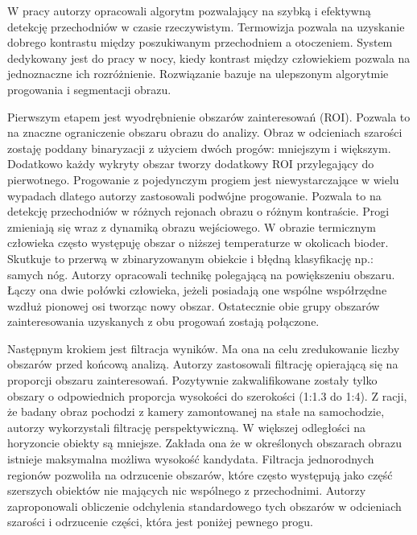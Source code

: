 W pracy \cite{kolzpoz} autorzy opracowali algorytm pozwalający na szybką i efektywną detekcję przechodniów w czasie rzeczywistym. 
Termowizja pozwala na uzyskanie dobrego kontrastu między poszukiwanym przechodniem a otoczeniem. 
System dedykowany jest do pracy w nocy, kiedy kontrast między człowiekiem pozwala na jednoznaczne ich rozróżnienie.  %
Rozwiązanie bazuje na ulepszonym algorytmie progowania i segmentacji obrazu. 

Pierwszym etapem jest wyodrębnienie obszarów zainteresowań (ROI). 
Pozwala to na znaczne ograniczenie obszaru obrazu do analizy. %
Obraz w odcieniach szarości zostaję poddany binaryzacji z użyciem dwóch progów: mniejszym i większym. 
Dodatkowo każdy wykryty obszar tworzy dodatkowy ROI przylegający do pierwotnego. %
Progowanie z pojedynczym progiem jest niewystarczające w wielu wypadach dlatego autorzy zastosowali podwójne progowanie. %
Pozwala to na detekcję przechodniów w różnych rejonach obrazu o różnym kontraście. 
Progi zmieniają się wraz z dynamiką obrazu wejściowego. 
W obrazie termicznym człowieka często występuję obszar o niższej temperaturze w okolicach bioder. 
Skutkuje to przerwą w zbinaryzowanym obiekcie i błędną klasyfikację np.: samych nóg. 
Autorzy opracowali technikę polegającą na powiększeniu obszaru. 
Łączy ona dwie połówki człowieka, jeżeli posiadają one wspólne współrzędne wzdłuż pionowej osi tworząc nowy obszar. %
Ostatecznie obie grupy obszarów zainteresowania uzyskanych z obu progowań zostają połączone. %

Następnym krokiem jest filtracja wyników. 
Ma ona na celu zredukowanie liczby obszarów przed końcową analizą. 
Autorzy zastosowali filtrację opierającą się na proporcji obszaru zainteresowań. 
Pozytywnie zakwalifikowane zostały tylko obszary o odpowiednich proporcja wysokości do szerokości (1:1.3 do 1:4). 
Z racji, że badany obraz pochodzi z kamery zamontowanej na stałe na samochodzie, autorzy wykorzystali filtrację perspektywiczną. 
W większej odległości na horyzoncie obiekty są mniejsze. %
Zakłada ona że w określonych obszarach obrazu istnieje maksymalna możliwa wysokość kandydata. 
Filtracja jednorodnych regionów pozwoliła na odrzucenie obszarów, które często występują jako część szerszych obiektów nie mających nic wspólnego z przechodnimi. %
Autorzy zaproponowali obliczenie odchylenia standardowego tych obszarów w odcieniach szarości i odrzucenie części, która jest poniżej pewnego progu. 

